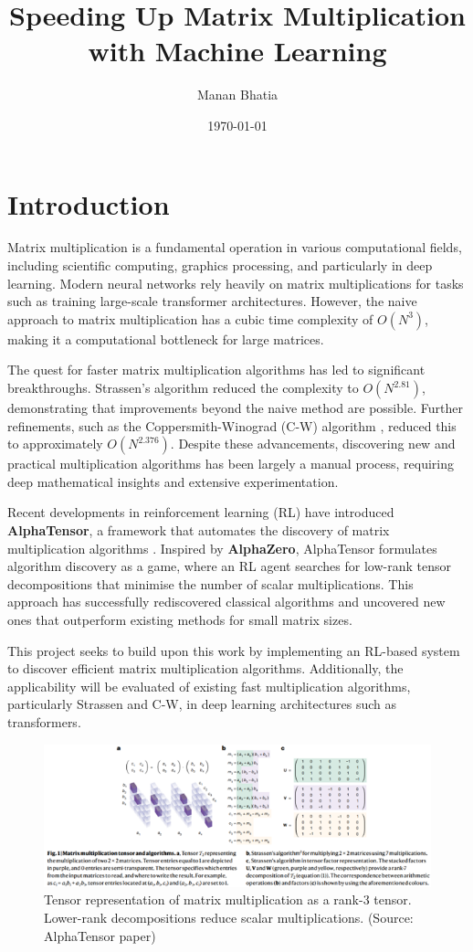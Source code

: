 \documentclass{article}
\title{Speeding Up Matrix Multiplication with Machine Learning}
\author{Manan Bhatia}
\date{\today}
\begin{document}
\maketitle

\section{Introduction}
Matrix multiplication is a fundamental operation in various computational fields, including scientific computing, graphics processing, and particularly in deep learning. Modern neural networks rely heavily on matrix multiplications for tasks such as training large-scale transformer architectures. However, the naive approach to matrix multiplication has a cubic time complexity of \( O(N^3) \), making it a computational bottleneck for large matrices.  

The quest for faster matrix multiplication algorithms has led to significant breakthroughs. Strassen's algorithm \cite{strassen1969gaussian} reduced the complexity to \( O(N^{2.81}) \), demonstrating that improvements beyond the naive method are possible. Further refinements, such as the Coppersmith-Winograd (C-W) algorithm \cite{coppersmith1990matrix}, reduced this to approximately \( O(N^{2.376}) \). Despite these advancements, discovering new and practical multiplication algorithms has been largely a manual process, requiring deep mathematical insights and extensive experimentation.  

Recent developments in reinforcement learning (RL) have introduced \textbf{AlphaTensor}, a framework that automates the discovery of matrix multiplication algorithms \cite{fawzi2022discovering}. Inspired by \textbf{AlphaZero}, AlphaTensor formulates algorithm discovery as a game, where an RL agent searches for low-rank tensor decompositions that minimise the number of scalar multiplications. This approach has successfully rediscovered classical algorithms and uncovered new ones that outperform existing methods for small matrix sizes.  

This project seeks to build upon this work by implementing an RL-based system to discover efficient matrix multiplication algorithms. Additionally, the applicability will be evaluated of existing fast multiplication algorithms, particularly Strassen and C-W, in deep learning architectures such as transformers.
\begin{figure}[H]
    \centering
    \includegraphics[width=0.6\linewidth]{Picture1.png}
    \caption{Tensor representation of matrix multiplication as a rank-3 tensor. Lower-rank decompositions reduce scalar multiplications. (Source: AlphaTensor paper)}
    \label{fig:tensor-representation}
\end{figure}
\end{document}
